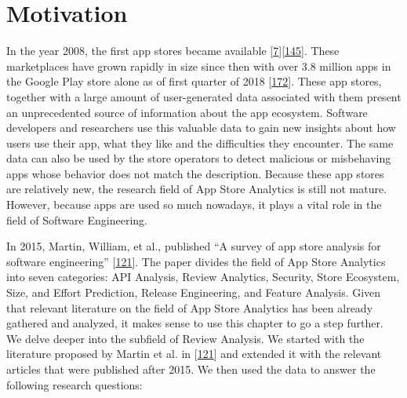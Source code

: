 \documentclass[]{book}
\begin{document}
\section{Motivation}\label{motivation-6}

In the year 2008, the first app stores became available
{[}\protect\hyperlink{ref-appStoreLaunch}{7}{]}{[}\protect\hyperlink{ref-androidMarketLaunch}{145}{]}.
These marketplaces have grown rapidly in size since then with over 3.8
million apps in the Google Play store alone as of first quarter of 2018
{[}\protect\hyperlink{ref-appNumber}{172}{]}. These app stores, together
with a large amount of user-generated data associated with them present
an unprecedented source of information about the app ecosystem. Software
developers and researchers use this valuable data to gain new insights
about how users use their app, what they like and the difficulties they
encounter. The same data can also be used by the store operators to
detect malicious or misbehaving apps whose behavior does not match the
description. Because these app stores are relatively new, the research
field of App Store Analytics is still not mature. However, because apps
are used so much nowadays, it plays a vital role in the field of
Software Engineering.

In 2015, Martin, William, et al., published ``A survey of app store
analysis for software engineering''
{[}\protect\hyperlink{ref-martin2015survey}{121}{]}. The paper divides
the field of App Store Analytics into seven categories: API Analysis,
Review Analytics, Security, Store Ecosystem, Size, and Effort
Prediction, Release Engineering, and Feature Analysis. Given that
relevant literature on the field of App Store Analytics has been already
gathered and analyzed, it makes sense to use this chapter to go a step
further. We delve deeper into the subfield of Review Analysis. We
started with the literature proposed by Martin et al. in
{[}\protect\hyperlink{ref-martin2015survey}{121}{]} and extended it with
the relevant articles that were published after 2015. We then used the
data to answer the following research questions:
\end{document}

